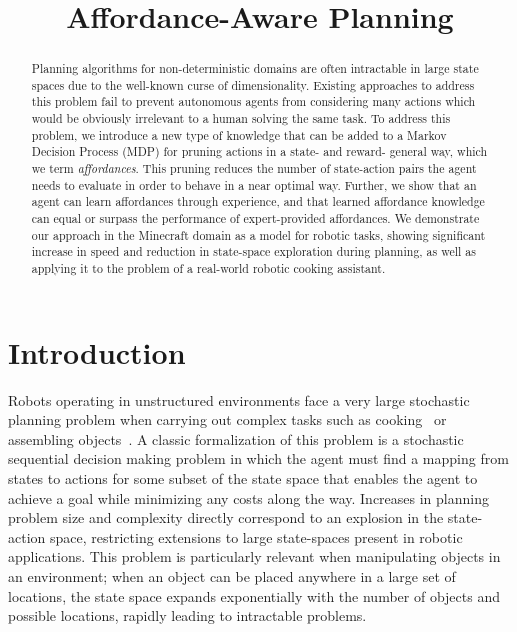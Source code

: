 \documentclass[conference]{IEEEtran}
\begin{document}
\title{Affordance-Aware Planning}

\author{
}

\maketitle

\begin{abstract}
Planning algorithms for non-deterministic domains are often
intractable in large state spaces due to the well-known curse of
dimensionality.  Existing approaches to address this problem fail to
prevent autonomous agents from considering many actions which would be
obviously irrelevant to a human solving the same task.  To address
this problem, we introduce a new type of knowledge that can be added
to a Markov Decision Process (MDP) for pruning actions in a state- and
reward- general way, which we term {\em affordances}.  This pruning
reduces the number of state-action pairs the agent needs to evaluate
in order to behave in a near optimal way.  Further, we show that an
agent can learn affordances through experience, and that learned
affordance knowledge can equal or surpass the performance of
expert-provided affordances.  We demonstrate our approach in the
Minecraft domain as a model for robotic tasks, showing significant
increase in speed and reduction in state-space exploration during
planning, as well as applying it to the problem of a real-world
robotic cooking assistant. 

\end{abstract}

\IEEEpeerreviewmaketitle

\section{Introduction}
\label{sec:introduction}

Robots operating in unstructured environments face a very large
stochastic planning problem when carrying out complex tasks such as
cooking~\citep{bollini12} or assembling objects~\citep{knepper13}.  A
classic formalization of this problem is a stochastic sequential
decision making problem in which the agent must find a mapping from
states to actions for some subset of the state space that enables the
agent to achieve a goal while minimizing any costs along the way.
Increases in planning problem size and complexity directly correspond
to an explosion in the state-action space, restricting extensions to
large state-spaces present in robotic applications.  This problem is
particularly relevant when manipulating objects in an environment;
when an object can be placed anywhere in a large set of locations, the
state space expands exponentially with the number of objects and
possible locations, rapidly leading to intractable problems.
\end{document}

